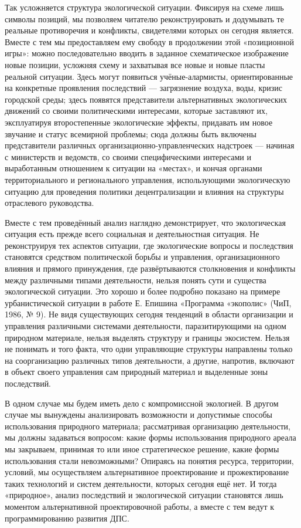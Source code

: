 \documentclass[11pt,a4paper]{article}
\begin{document}
Так усложняется структура экологической ситуации. Фиксируя на схеме лишь
символы позиций, мы позволяем читателю реконструировать и додумывать те
реальные противоречия и конфликты, свидетелями которых он сегодня
является. Вместе с тем мы предоставляем ему свободу в продолжении этой
«позиционной игры»: можно последовательно вводить в заданное схематическое
изображение новые позиции, усложняя схему и захватывая все новые и новые
пласты реальной ситуации. Здесь могут появиться учёные-алармисты,
ориентированные на конкретные проявления последствий — загрязнение воздуха,
воды, кризис городской среды; здесь появятся представители альтернативных
экологических движений со своими политическими интересами, которые заставляют
их, эксплуатируя второстепенные экологические эффекты, придавать им новое
звучание и статус всемирной проблемы; сюда должны быть включены представители
различных организационно-управленческих надстроек — начиная с министерств и
ведомств, со своими специфическими интересами и выработанным отношением к
ситуации на «местах», и кончая органами территориального и регионального
управления, использующими экологическую ситуацию для проведения политики
децентрализации и влияния на структуры отраслевого руководства. 

Вместе с тем проведённый анализ наглядно демонстрирует, что экологическая
ситуация есть прежде всего социальная и деятельностная ситуация. Не
реконструируя тех аспектов ситуации, где экологические вопросы и последствия
становятся средством политической борьбы и управления, организационного
влияния и прямого принуждения, где развёртываются столкновения и конфликты
между различными типами деятельности, нельзя понять сути и существа
экологической ситуации. Это хорошо и более подробно показано на примере
урбанистической ситуации в работе Е. Епишина «Программа «экополис» (ЧиП, 1986,
№ 9). Не видя существующих сегодня тенденций в области организации и
управления различными системами деятельности, паразитирующими на одном
природном материале, нельзя выделять структуру и границы экосистем. Нельзя не
понимать и того факта, что одни управляющие структуры направлены только на
соорганизацию различных типов деятельности, а другие, напротив, включают в
объект своего управления сам природный материал и выделенные зоны
последствий. 

В одном случае мы будем иметь дело с компромиссной экологией. В другом случае
мы вынуждены анализировать возможности и допустимые способы использования
природного материала; рассматривая организацию деятельности, мы должны
задаваться вопросом: какие формы использования природного ареала мы закрываем,
принимая то или иное стратегическое решение, какие формы использования стали
невозможными? Опираясь на понятия ресурса, территории, условий, мы
осуществляем альтернативное проектирование и прожектирование таких технологий
и систем деятельности, которых сегодня ещё нет. И тогда «природное», анализ
последствий и экологической ситуации становятся лишь моментом альтернативной
проектировочной работы, а вместе с тем ведут к программированию развития ДПС.
\end{document}

